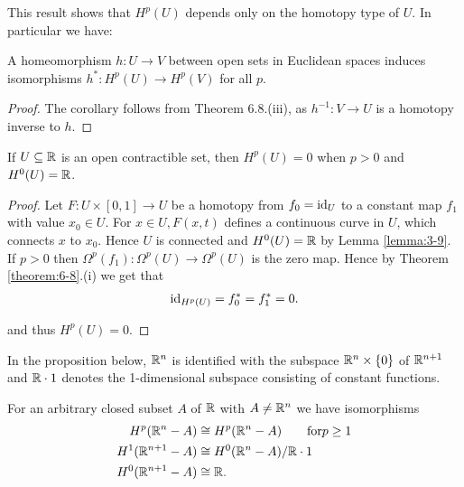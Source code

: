 This result shows that $H^p(U)$ depends only on the homotopy type of $U$. In
particular we have:

\begin{corollary}\label{corollary:6-9}
A homeomorphism $h:U\to V$ between open sets in Euclidean spaces induces isomorphisms $h^*:H^p(U)\to H^p(V)$ for
all $p$.
\end{corollary}

\begin{proof}
  The corollary follows from Theorem 6.8.(iii), as $h^{-1}:V\to U$ is a
homotopy inverse to $h$.
\end{proof}

\begin{corollary}\label{corollary:6-10}
If $U\subseteq \mathbb{R}$ is an open contractible set, then $H^p(U) = 0$ when
$p > 0$ and $H^0(U) = \mathbb{R}$.
\end{corollary}


\begin{proof}
Let $F:U\times[0, 1]\to U$ be a homotopy from $f_0 =\operatorname{id}_U$ to a constant map
$f_1$ with value $x_0\in U$. For $x\in U, F(x, t)$ defines a continuous curve in $U$,
which connects $x$ to $x_0$. Hence $U$ is connected and $H^0(U) = \mathbb{R}$ by Lemma \ref{lemma:3-9}.
If $p > 0$ then $\Omega^p(f_1):\Omega^p(U)\to\Omega^p(U)$ is the zero map. Hence by Theorem
\ref{theorem:6-8}.(i) we get that
\begin{align*}
  \operatorname{id}_{H^p(U)} = f_0^* = f_1^* = 0.
\end{align*}

and thus $H^p(U) = 0$.
\end{proof}

In the proposition below, $\mathbb{R}^n$ is identified with the subspace $\mathbb{R}^n\times\{0\}$ of $\mathbb{R}^{n+1}$
and $\mathbb{R}\cdot 1$ denotes the 1-dimensional subspace consisting of constant functions.

\begin{proposition}\label{prop:6-11}
  For an arbitrary closed subset $A$ of $\mathbb{R}$ with $A\neq\mathbb{R}^n$ we have isomorphisms
  \begin{align*}
    H^p(\mathbb{R}^n - A) &\cong H^p(\mathbb{R}^n - A)\qquad\text{for} p\ge 1 \\
    H^1(\mathbb{R}^{n+1} - A) &\cong H^0(\mathbb{R}^n - A)/\mathbb{R}\cdot 1 \\
    H^0(\mathbb{R}^{n+1} - A) &\cong \mathbb{R}.
  \end{align*}
\end{proposition}


